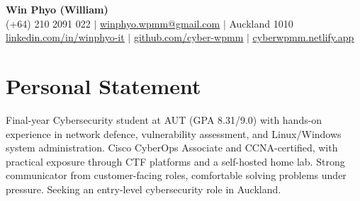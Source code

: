 \documentclass[letterpaper,11pt]{article}
\begin{document}
\setlength{\footskip}{4.08003pt}
\begin{center}
{\LARGE \textbf{Win Phyo (William)}} \\[10pt]
\small
(+64) 210 2091 022 \quad $|$ \quad
\href{mailto:winphyo.wpmm@gmail.com}{winphyo.wpmm@gmail.com} \quad $|$ \quad
Auckland 1010 \\[4pt]
\href{https://www.linkedin.com/in/winphyo-it/}{\underline{linkedin.com/in/winphyo-it}} \quad $|$ \quad
\href{https://github.com/cyber-wpmm}{\underline{github.com/cyber-wpmm}} \quad $|$ \quad
\href{https://cyberwpmm.netlify.app/}{\underline{cyberwpmm.netlify.app}}
\end{center}

\section{Personal Statement}
Final-year Cybersecurity student at AUT (GPA 8.31/9.0) with hands-on experience in network defence, vulnerability assessment, and Linux/Windows system administration. Cisco CyberOps Associate and CCNA-certified, with practical exposure through CTF platforms and a self-hosted home lab. Strong communicator from customer-facing roles, comfortable solving problems under pressure. Seeking an entry-level cybersecurity role in Auckland.

\end{document}

